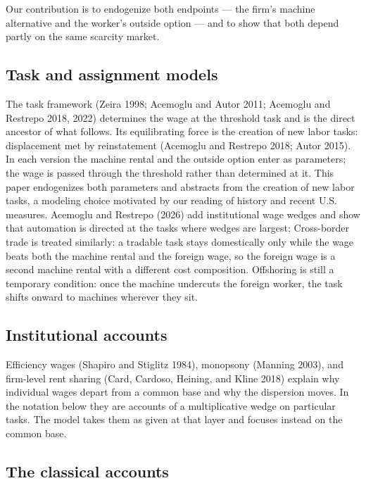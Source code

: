 \documentclass[12pt]{article}
\theoremstyle{plain}
\begin{document}
Our contribution is to endogenize both endpoints --- the firm's machine alternative and the worker's outside option --- and to show that both depend partly on the same scarcity market.

\subsection{Task and assignment models}\label{sec:tasks}

The task framework (Zeira 1998; Acemoglu and Autor 2011; Acemoglu and Restrepo 2018, 2022) determines the wage at the threshold task and is the direct ancestor of what follows. Its equilibrating force is the creation of new labor tasks: displacement met by reinstatement (Acemoglu and Restrepo 2018; Autor 2015). In each version the machine rental and the outside option enter as parameters; the wage is passed through the threshold rather than determined at it. This paper endogenizes both parameters and abstracts from the creation of new labor tasks, a modeling choice motivated by our reading of history and recent U.S. measures. Acemoglu and Restrepo (2026) add institutional wage wedges and show that automation is directed at the tasks where wedges are largest;  Cross-border trade is treated similarly: a tradable task stays domestically only while the wage beats both the machine rental and the foreign wage, so the foreign wage is a second machine rental with a different cost composition. Offshoring is still a temporary condition: once the machine undercuts the foreign worker, the task shifts onward to machines wherever they sit.

\subsection{Institutional accounts}\label{sec:institutions}

Efficiency wages (Shapiro and Stiglitz 1984), monopsony (Manning 2003), and firm-level rent sharing (Card, Cardoso, Heining, and Kline 2018) explain why individual wages depart from a common base and why the dispersion moves. In the notation below they are accounts of a multiplicative wedge on particular tasks. The model takes them as given at that layer and focuses instead on the common base.

\subsection{The classical accounts}\label{sec:classical}
\end{document}

